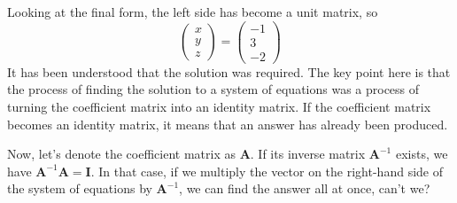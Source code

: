 \documentclass{ltjsbook}
\begin{document}
Looking at the final form, the left side has become a unit matrix, so
\[
	\begin{pmatrix}
		x \\
		y \\
		z
	\end{pmatrix}
	=
	\begin{pmatrix}
		-1 \\
		3  \\
		-2
	\end{pmatrix}
\]
It has been understood that the solution was required.
The key point here is that the process of finding the solution to a system of equations was a process of turning the coefficient matrix into an identity matrix. If the coefficient matrix becomes an identity matrix, it means that an answer has already been produced.

Now, let's denote the coefficient matrix as $\bm{A}$. If its inverse matrix $\bm{A}^{-1}$ exists, we have $\bm{A}^{-1}\bm{A} = \bm{I}$. In that case, if we multiply the vector on the right-hand side of the system of equations by $\bm{A}^{-1}$, we can find the answer all at once, can't we?
\end{document}
